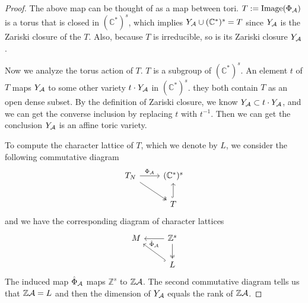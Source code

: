 \documentclass[11pt]{article}
\newcommand{\cplx}{\mathbb C}
\newcommand{\intg}{\mathbb Z}
\newcommand{\cala}{{\cal A}}
\begin{document}
\begin{proof}
The above map can be thought of as a map between tori. $T:=\text{Image}(\Phi_\cala)$ is a torus that is closed in $(\cplx^*)^s$, which implies $Y_{\cala}\cup (\cplx^*)^s=T$ since $Y_\cala$ is the Zariski closure of the $T$. Also, because $T$ is irreducible, so is its Zariski closure $Y_{\cala}$.

Now we analyze the torus action of $T$.  $T$ is a subgroup of $(\cplx^*)^s$. An element $t$ of $T$ maps $Y_{\cala}$ to some other variety $t\cdot Y_\cala$ in $(\cplx^*)^s$. they both contain $T$ as an open dense subset. By the definition of Zariski closure, we know $Y_{\cala}\subset t\cdot Y_{\cala}$, and we can get the converse inclusion by replacing $t$ with $t^{-1}$. Then we can get the conclusion $Y_{\cala}$ is an affine toric variety.

To compute the character lattice of $T$, which we denote by $L$, we consider the following commutative diagram
\[
\begin{tikzcd}
T_N \arrow[r,"\Phi_\cala"] \arrow[dr,two heads] & (\cplx^*)^s  \\
  & T \arrow[u,hook]
\end{tikzcd}
\]
and we have the corresponding diagram of character lattices
\[
\begin{tikzcd}
M  & \intg^s \arrow[l,"\hat{\Phi}_\cala"] \arrow[d,two heads] \\
  & L  \arrow[ul, hook]
\end{tikzcd}
\]
The induced map $\hat{\Phi}_\cala$ maps $\intg^s$ to $\intg \cala$. The second commutative diagram tells us that $\intg \cala=L$ and then the dimension of $Y_{\cala}$ equals the rank of $\intg \cala$.
\end{proof}
\end{document}
